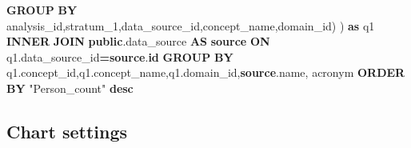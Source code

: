 \documentclass[
]{book}
\newenvironment{Shaded}{\begin{snugshade}}{\end{snugshade}}
\newcommand{\KeywordTok}[1]{\textcolor[rgb]{0.13,0.29,0.53}{\textbf{#1}}}
\newcommand{\NormalTok}[1]{#1}
\newcommand{\OperatorTok}[1]{\textcolor[rgb]{0.81,0.36,0.00}{\textbf{#1}}}
\newcommand{\OtherTok}[1]{\textcolor[rgb]{0.56,0.35,0.01}{#1}}
\begin{document}
\begin{Shaded}
\begin{Highlighting}[]
            \KeywordTok{GROUP} \KeywordTok{BY}\NormalTok{ analysis\_id,stratum\_1,data\_source\_id,concept\_name,domain\_id) ) }\KeywordTok{as}\NormalTok{ q1}
    \KeywordTok{INNER} \KeywordTok{JOIN} \KeywordTok{public}\NormalTok{.data\_source }\KeywordTok{AS} \KeywordTok{source} \KeywordTok{ON}\NormalTok{ q1.data\_source\_id}\OperatorTok{=}\KeywordTok{source}\NormalTok{.}\KeywordTok{id}
\KeywordTok{GROUP} \KeywordTok{BY}\NormalTok{ q1.concept\_id,q1.concept\_name,q1.domain\_id,}\KeywordTok{source}\NormalTok{.name, acronym}
\KeywordTok{ORDER} \KeywordTok{BY} \OtherTok{"Person\_count"} \KeywordTok{desc}
\end{Highlighting}
\end{Shaded}

\hypertarget{chart-settings-24}{%
\subsection{Chart settings}\label{chart-settings-24}}
\end{document}
